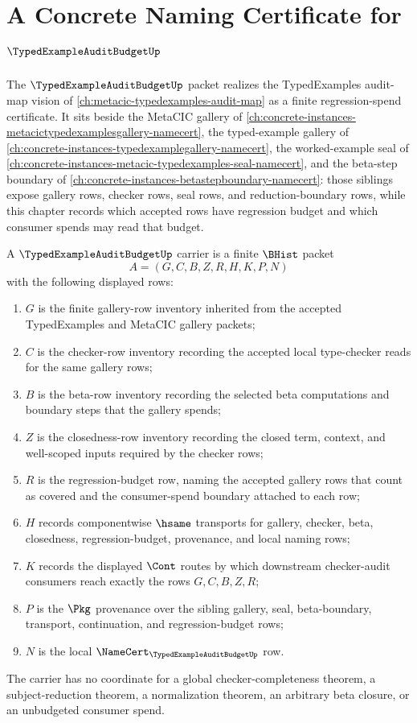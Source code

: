 \chapter{A Concrete Naming Certificate for $\TypedExampleAuditBudgetUp$}
\label{ch:concrete-instances-typedexampleauditbudget-namecert}

The $\TypedExampleAuditBudgetUp$ packet realizes the TypedExamples audit-map vision of \autoref{ch:metacic-typedexamples-audit-map} as a finite regression-spend certificate. It sits beside the MetaCIC gallery of \autoref{ch:concrete-instances-metacictypedexamplesgallery-namecert}, the typed-example gallery of \autoref{ch:concrete-instances-typedexamplegallery-namecert}, the worked-example seal of \autoref{ch:concrete-instances-metacic-typedexamples-seal-namecert}, and the beta-step boundary of \autoref{ch:concrete-instances-betastepboundary-namecert}: those siblings expose gallery rows, checker rows, seal rows, and reduction-boundary rows, while this chapter records which accepted rows have regression budget and which consumer spends may read that budget.

\begin{definition}
\label{def:typed-example-audit-budget-carrier}
A $\TypedExampleAuditBudgetUp$ carrier is a finite $\BHist$ packet
$$
A=(G,C,B,Z,R,H,K,P,N)
$$
with the following displayed rows:
\begin{enumerate}
\item $G$ is the finite gallery-row inventory inherited from the accepted TypedExamples and MetaCIC gallery packets;
\item $C$ is the checker-row inventory recording the accepted local type-checker reads for the same gallery rows;
\item $B$ is the beta-row inventory recording the selected beta computations and boundary steps that the gallery spends;
\item $Z$ is the closedness-row inventory recording the closed term, context, and well-scoped inputs required by the checker rows;
\item $R$ is the regression-budget row, naming the accepted gallery rows that count as covered and the consumer-spend boundary attached to each row;
\item $H$ records componentwise $\hsame$ transports for gallery, checker, beta, closedness, regression-budget, provenance, and local naming rows;
\item $K$ records the displayed $\Cont$ routes by which downstream checker-audit consumers reach exactly the rows $G,C,B,Z,R$;
\item $P$ is the $\Pkg$ provenance over the sibling gallery, seal, beta-boundary, transport, continuation, and regression-budget rows;
\item $N$ is the local $\NameCert_{\TypedExampleAuditBudgetUp}$ row.
\end{enumerate}
The carrier has no coordinate for a global checker-completeness theorem, a subject-reduction theorem, a normalization theorem, an arbitrary beta closure, or an unbudgeted consumer spend.
\end{definition}


